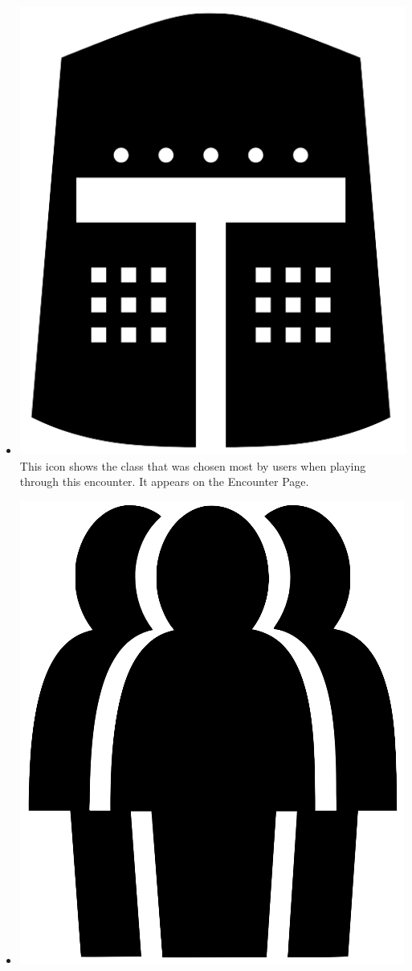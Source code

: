 \documentclass[12pt,a4paper]{report}
\begin{document}
\begin{itemize}
		\item \includegraphics[scale=.03]{most_popular_class}
		This icon shows the class that was chosen most by users when playing through this encounter. It appears on the Encounter Page.
		\begin{figure}
			\label{fig: Most Popular Class Icon}
		\end{figure}
		\item \includegraphics[scale=.03]{most_popular_race}

\end{itemize}
\end{document}
